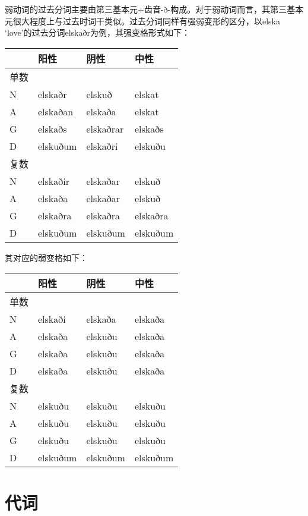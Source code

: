 弱动词的过去分词主要由第三基本元+齿音-ð-构成。对于弱动词而言，其第三基本元很大程度上与过去时词干类似。过去分词同样有强弱变形的区分，以elska
`love‌'的过去分词elskaðr为例，其强变格形式如下：

\begin{longtable}{llll}
  \toprule
     & 阳性       & 阴性        & 中性       \\
  \midrule
  \endhead
  \bottomrule
  \endfoot
  单数 &          &           &          \\
  N  & elskaðr  & elskuð    & elskat   \\
  A  & elskaðan & elskaða   & elskat   \\
  G  & elskaðs  & elskaðrar & elskaðs  \\
  D  & elskuðum & elskaðri  & elskuðu  \\
  复数 &          &           &          \\
  N  & elskaðir & elskaðar  & elskuð   \\
  A  & elskaða  & elskaðar  & elskuð   \\
  G  & elskaðra & elskaðra  & elskaðra \\
  D  & elskuðum & elskuðum  & elskuðum \\
\end{longtable}

其对应的弱变格如下：

\begin{longtable}{llll}
  \toprule
     & 阳性       & 阴性       & 中性       \\
  \midrule
  \endhead
  \bottomrule
  \endfoot
  单数 &          &          &          \\
  N  & elskaði  & elskaða  & elskaða  \\
  A  & elskaða  & elskuðu  & elskaða  \\
  G  & elskaða  & elskuðu  & elskaða  \\
  D  & elskaða  & elskuðu  & elskaða  \\
  复数 &          &          &          \\
  N  & elskuðu  & elskuðu  & elskuðu  \\
  A  & elskuðu  & elskuðu  & elskuðu  \\
  G  & elskuðu  & elskuðu  & elskuðu  \\
  D  & elskuðum & elskuðum & elskuðum \\
\end{longtable}

\chapter{代词}\label{代词}

